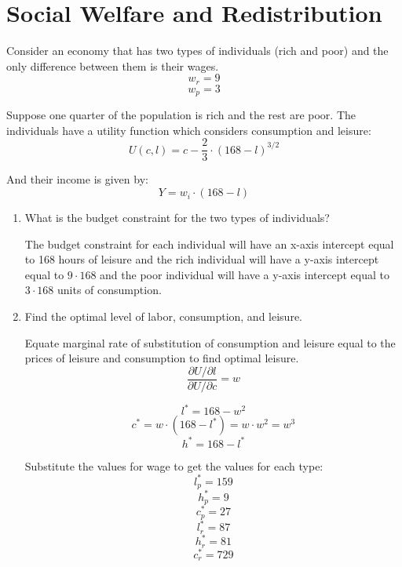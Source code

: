 \documentclass{article}
\begin{document}
\section{ Social Welfare and Redistribution }

Consider an economy that has two types of individuals (rich and poor) and the
only difference between them is their wages. 
$$ w_{r} = 9 $$
$$ w_{p} = 3 $$

Suppose one quarter of the population is rich and the rest are poor. The
individuals have a utility function which considers consumption and leisure:
$$ U( c, l ) = c - \frac{ 2 }{ 3 } \cdot ( 168 - l )^{3/2} $$

And their income is given by:
$$ Y = w_{i} \cdot ( 168 - l ) $$

\begin{enumerate}[1.]
    \item What is the budget constraint for the two types of individuals?

        The budget constraint for each individual will have an x-axis intercept
        equal to 168 hours of leisure and the rich individual will have a y-axis
        intercept equal to $9 \cdot 168$ and the poor individual will have a
        y-axis intercept equal to $3 \cdot 168$ units of consumption.

    \item Find the optimal level of labor, consumption, and leisure.

        Equate marginal rate of substitution of consumption and leisure equal to
        the prices of leisure and consumption to find optimal leisure.
        $$ \frac{ \partial U / \partial l }{ \partial U / \partial c } = w $$

        $$ l^{*} = 168 - w^{2} $$
        $$ c^{*} = w \cdot ( 168 - l^{*} ) = w \cdot w^{2} = w^{3} $$
        $$ h^{*} = 168 - l^{*} $$

        Substitute the values for wage to get the values for each type:
        $$ l^{*}_{p} = 159 $$
        $$ h^{*}_{p} = 9 $$
        $$ c^{*}_{p} = 27 $$
        $$ l^{*}_{r} = 87 $$
        $$ h^{*}_{r} = 81 $$ 
        $$ c^{*}_{r} = 729 $$

\end{enumerate}
\end{document}
